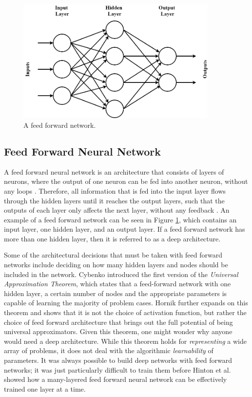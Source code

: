 \documentclass{UoYCSproject}
\begin{document}
\begin{figure}[h]
\includegraphics[width=10cm]{feedforward.png}
\centering
\caption{A feed forward network.} 
\label{fig:feedforward}
\end{figure}

\subsection{Feed Forward Neural Network}
A feed forward neural network is an architecture that consists of layers of neurons, where the output of one neuron can be fed into another neuron, without any loops \cite{jain1996artificial}. Therefore, all information that is fed into the input layer flows through the hidden layers until it reaches the output layers, such that the outputs of each layer only affects the next layer, without any feedback \cite{jhaartificial}. An example of a feed forward network can be seen in Figure \ref{fig:feedforward}, which contains an input layer, one hidden layer, and an output layer. If a feed forward network has more than one hidden layer, then it is referred to as a deep architecture. 

Some of the architectural decisions that must be taken with feed forward networks include deciding on how many hidden layers and nodes should be included in the network. Cybenko \cite{cybenko1989approximation} introduced the first version of the \textit{Universal Approximation Theorem}, which states that a feed-forward network with one hidden layer, a certain number of nodes and the appropriate parameters is capable of learning the majority of problem cases. Hornik \cite{hornik1991approximation} further expands on this theorem and shows that it is not the choice of activation function, but rather the choice of feed forward architecture that brings out the full potential of being universal approximators. Given this theorem, one might wonder why anyone would need a deep architecture. While this theorem holds for \textit{representing} a wide array of problems, it does not deal with the algorithmic \textit{learnability} of parameters. It was always possible to build deep networks with feed forward networks; it was just particularly difficult to train them before Hinton et al. \cite{hinton2006fast} showed how a many-layered feed forward neural network can be effectively trained one layer at a time. 
\end{document}
